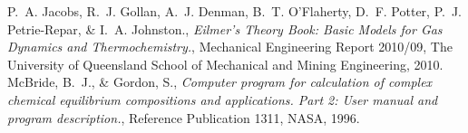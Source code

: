 \documentclass{AIAA}
\begin{document}
\begin{thebibliography}{}
P.~A. Jacobs, R.~J. Gollan, A.~J. Denman, B.~T. O'Flaherty, D.~F. Potter, P.~J. Petrie-Repar, \& I.~A. Johnston., {\it Eilmer's Theory Book: Basic Models for Gas Dynamics and Thermochemistry.}, Mechanical Engineering Report 2010/09, The University of Queensland School of Mechanical and Mining Engineering, 2010.
McBride, B.~J., \& Gordon, S., {\it Computer program for calculation of complex chemical equilibrium	compositions and applications. Part 2: User manual and program description.}, Reference Publication 1311, NASA, 1996.


\end{thebibliography}
\end{document}
